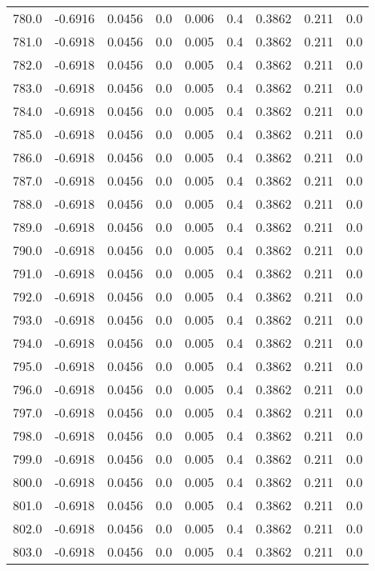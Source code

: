 \begin{longtable}{lrrrrrrrr}
780.0 & -0.6916 & 0.0456 & 0.0 & 0.006 & 0.4 & 0.3862 & 0.211 & 0.0 \\
781.0 & -0.6918 & 0.0456 & 0.0 & 0.005 & 0.4 & 0.3862 & 0.211 & 0.0 \\
782.0 & -0.6918 & 0.0456 & 0.0 & 0.005 & 0.4 & 0.3862 & 0.211 & 0.0 \\
783.0 & -0.6918 & 0.0456 & 0.0 & 0.005 & 0.4 & 0.3862 & 0.211 & 0.0 \\
784.0 & -0.6918 & 0.0456 & 0.0 & 0.005 & 0.4 & 0.3862 & 0.211 & 0.0 \\
785.0 & -0.6918 & 0.0456 & 0.0 & 0.005 & 0.4 & 0.3862 & 0.211 & 0.0 \\
786.0 & -0.6918 & 0.0456 & 0.0 & 0.005 & 0.4 & 0.3862 & 0.211 & 0.0 \\
787.0 & -0.6918 & 0.0456 & 0.0 & 0.005 & 0.4 & 0.3862 & 0.211 & 0.0 \\
788.0 & -0.6918 & 0.0456 & 0.0 & 0.005 & 0.4 & 0.3862 & 0.211 & 0.0 \\
789.0 & -0.6918 & 0.0456 & 0.0 & 0.005 & 0.4 & 0.3862 & 0.211 & 0.0 \\
790.0 & -0.6918 & 0.0456 & 0.0 & 0.005 & 0.4 & 0.3862 & 0.211 & 0.0 \\
791.0 & -0.6918 & 0.0456 & 0.0 & 0.005 & 0.4 & 0.3862 & 0.211 & 0.0 \\
792.0 & -0.6918 & 0.0456 & 0.0 & 0.005 & 0.4 & 0.3862 & 0.211 & 0.0 \\
793.0 & -0.6918 & 0.0456 & 0.0 & 0.005 & 0.4 & 0.3862 & 0.211 & 0.0 \\
794.0 & -0.6918 & 0.0456 & 0.0 & 0.005 & 0.4 & 0.3862 & 0.211 & 0.0 \\
795.0 & -0.6918 & 0.0456 & 0.0 & 0.005 & 0.4 & 0.3862 & 0.211 & 0.0 \\
796.0 & -0.6918 & 0.0456 & 0.0 & 0.005 & 0.4 & 0.3862 & 0.211 & 0.0 \\
797.0 & -0.6918 & 0.0456 & 0.0 & 0.005 & 0.4 & 0.3862 & 0.211 & 0.0 \\
798.0 & -0.6918 & 0.0456 & 0.0 & 0.005 & 0.4 & 0.3862 & 0.211 & 0.0 \\
799.0 & -0.6918 & 0.0456 & 0.0 & 0.005 & 0.4 & 0.3862 & 0.211 & 0.0 \\
800.0 & -0.6918 & 0.0456 & 0.0 & 0.005 & 0.4 & 0.3862 & 0.211 & 0.0 \\
801.0 & -0.6918 & 0.0456 & 0.0 & 0.005 & 0.4 & 0.3862 & 0.211 & 0.0 \\
802.0 & -0.6918 & 0.0456 & 0.0 & 0.005 & 0.4 & 0.3862 & 0.211 & 0.0 \\
803.0 & -0.6918 & 0.0456 & 0.0 & 0.005 & 0.4 & 0.3862 & 0.211 & 0.0 \\

\end{longtable}
